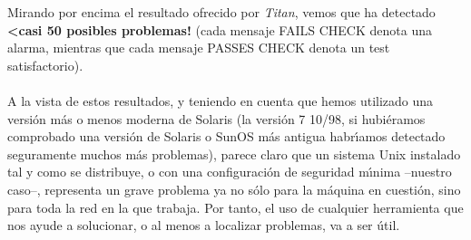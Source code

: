 Mirando por encima el resultado ofrecido por {\it Titan}, vemos que ha 
detectado {\bf <casi 50 posibles problemas!} (cada mensaje {\sc FAILS CHECK} 
denota una alarma, mientras que cada mensaje {\sc PASSES CHECK} denota un 
test satisfactorio).\\
\\A la vista de estos resultados, y teniendo en cuenta que hemos utilizado una
versi\'on m\'as o menos moderna de Solaris (la versi\'on 7 10/98, si 
hubi\'eramos comprobado una versi\'on de Solaris o SunOS m\'as antigua 
habr\'{\i}amos detectado seguramente muchos m\'as problemas), parece claro que
un sistema Unix instalado tal y como se distribuye, o con una configuraci\'on
de seguridad m\'{\i}nima --nuestro caso--, representa un grave problema ya no
s\'olo para la m\'aquina en cuesti\'on, sino para toda la red en la que 
trabaja. Por tanto, el uso de cualquier herramienta que nos ayude a solucionar,
o al menos a localizar problemas, va a ser \'util.

